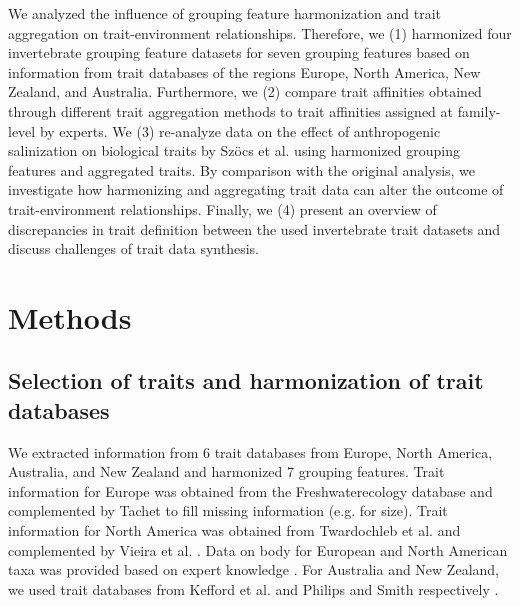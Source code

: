 \documentclass{article}
\begin{document}
We analyzed the influence of grouping feature harmonization and trait aggregation on trait-environment relationships. 
Therefore, we (1) harmonized four invertebrate grouping feature datasets for seven grouping features based on information from trait databases of the regions Europe, North America, New Zealand, and Australia. Furthermore, we (2) compare trait affinities obtained through different trait aggregation methods to trait affinities assigned at family-level by experts. We (3) re-analyze data on the effect of anthropogenic salinization on biological traits by Szöcs et al. \cite{szocs_effects_2014} using harmonized grouping features and aggregated traits. By comparison with the original analysis, we investigate how harmonizing and aggregating trait data can alter the outcome of trait-environment relationships. Finally, we (4) present an overview of discrepancies in trait definition between the used invertebrate trait datasets and discuss challenges of trait data synthesis.

\newpage


\section*{Methods}

\subsection*{Selection of traits and harmonization of trait databases}

We extracted information from 6 trait databases from Europe, North America, Australia, and New Zealand and harmonized 7 grouping features. Trait information for Europe was obtained from the Freshwaterecology database \cite{schmidt-kloiber_www.freshwaterecology.info_2015} and complemented by Tachet \cite{usseglio-polatera_biomonitoring_2000} to fill missing information (e.g. for size).
Trait information for North America was obtained from Twardochleb et al. \cite{twardochleb_trait_data_2020} and complemented by Vieira et al. \cite{vieira_database_nodate}. Data on body for European and North American taxa was provided based on expert knowledge \cite{polatera_personal_information_2020}. For Australia and New Zealand, we used trait databases from Kefford et al. \cite{kefford_integrated_2020} and Philips and Smith respectively \cite{Philips_and_Smith_NZ_DB_2018}.
\end{document}
